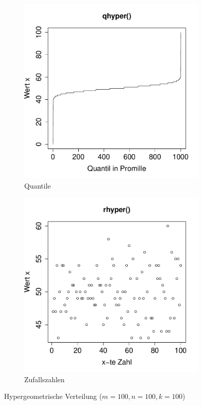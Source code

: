 \begin{figure}[h!]
\begin{subfigure}[b]{0.48\textwidth}
\includegraphics{verteilungen-007}
\caption{Quantile}
\end{subfigure}
\begin{subfigure}[b]{0.48\textwidth}
\includegraphics{verteilungen-008}
\caption{Zufallszahlen}
\end{subfigure}
\caption{Hypergeometrische Verteilung ($m=100, n=100, k=100$)}
\label{fig:hyper}
\end{figure}

